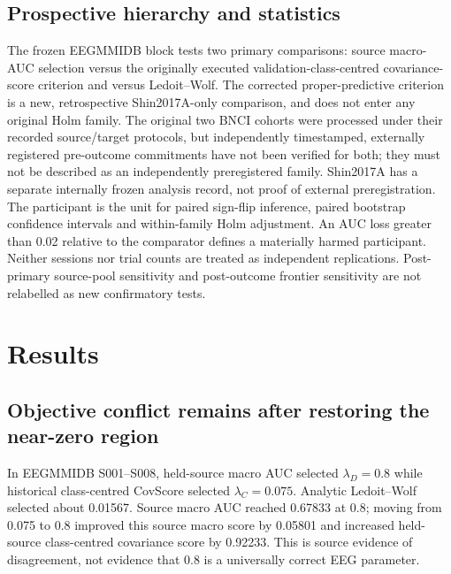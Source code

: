 \documentclass[12pt,a4paper]{article}
\begin{document}
\subsection{Prospective hierarchy and statistics}
The frozen EEGMMIDB block tests two primary comparisons: source macro-AUC
selection versus the originally executed validation-class-centred
covariance-score criterion and versus Ledoit--Wolf. The corrected
proper-predictive criterion is a new, retrospective Shin2017A-only
comparison, and does not enter any original Holm family.
The original two BNCI cohorts were processed under their recorded
source/target protocols, but independently timestamped, externally
registered pre-outcome commitments have not been verified for both;
they must not be described as an independently preregistered family.
Shin2017A has a separate internally frozen analysis record, not
proof of external preregistration.
The participant is the unit for paired sign-flip inference, paired bootstrap
confidence intervals and within-family Holm adjustment. An AUC loss
greater than 0.02 relative to the comparator defines a materially harmed
participant. Neither sessions nor trial counts are treated as independent
replications. Post-primary source-pool sensitivity and post-outcome frontier
sensitivity are not relabelled as new confirmatory tests.


\section{Results}
\subsection{Objective conflict remains after restoring the near-zero region}
In EEGMMIDB S001--S008, held-source macro AUC selected
\(\lambda_D=0.8\) while historical class-centred CovScore selected \(\lambda_C=0.075\).
Analytic Ledoit--Wolf selected about 0.01567. Source macro AUC reached
0.67833 at 0.8; moving from 0.075 to 0.8 improved this source macro
score by 0.05801 and increased held-source class-centred covariance score by 0.92233.
This is source evidence of disagreement, not evidence that 0.8 is a
universally correct EEG parameter.
\end{document}
